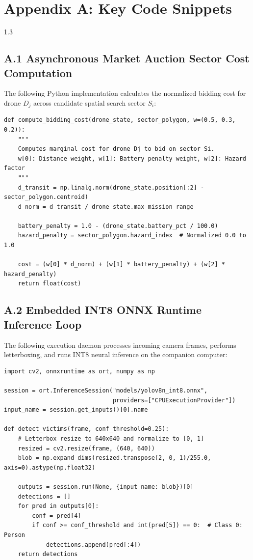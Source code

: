 \chapter*{Appendix A: Key Code Snippets}
\begin{spacing}{1.3}

\section*{A.1 Asynchronous Market Auction Sector Cost Computation}
The following Python implementation calculates the normalized bidding cost for drone $D_j$ across candidate spatial search sector $S_i$:

\begin{verbatim}
def compute_bidding_cost(drone_state, sector_polygon, w=(0.5, 0.3, 0.2)):
    """
    Computes marginal cost for drone Dj to bid on sector Si.
    w[0]: Distance weight, w[1]: Battery penalty weight, w[2]: Hazard factor
    """
    d_transit = np.linalg.norm(drone_state.position[:2] - sector_polygon.centroid)
    d_norm = d_transit / drone_state.max_mission_range
    
    battery_penalty = 1.0 - (drone_state.battery_pct / 100.0)
    hazard_penalty = sector_polygon.hazard_index  # Normalized 0.0 to 1.0
    
    cost = (w[0] * d_norm) + (w[1] * battery_penalty) + (w[2] * hazard_penalty)
    return float(cost)
\end{verbatim}

\section*{A.2 Embedded INT8 ONNX Runtime Inference Loop}
The following execution daemon processes incoming camera frames, performs letterboxing, and runs INT8 neural inference on the companion computer:

\begin{verbatim}
import cv2, onnxruntime as ort, numpy as np

session = ort.InferenceSession("models/yolov8n_int8.onnx", 
                               providers=["CPUExecutionProvider"])
input_name = session.get_inputs()[0].name

def detect_victims(frame, conf_threshold=0.25):
    # Letterbox resize to 640x640 and normalize to [0, 1]
    resized = cv2.resize(frame, (640, 640))
    blob = np.expand_dims(resized.transpose(2, 0, 1)/255.0, axis=0).astype(np.float32)
    
    outputs = session.run(None, {input_name: blob})[0]
    detections = []
    for pred in outputs[0]:
        conf = pred[4]
        if conf >= conf_threshold and int(pred[5]) == 0:  # Class 0: Person
            detections.append(pred[:4])
    return detections
\end{verbatim}

\end{spacing}

